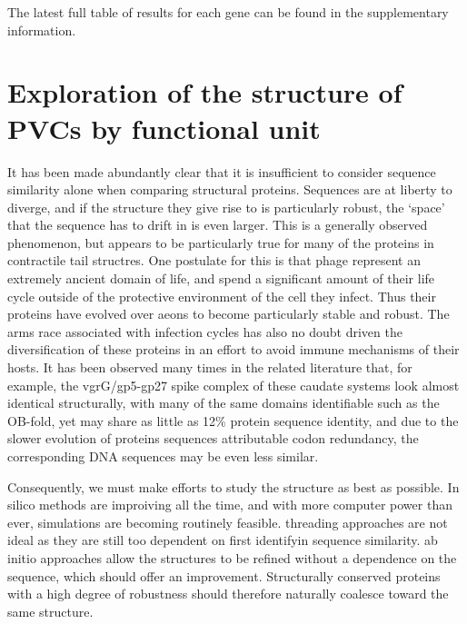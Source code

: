 	The latest full table of results for each gene can be found in the supplementary information.
	
	
	
\section{Exploration of the structure of PVCs by functional unit}
It has been made abundantly clear that it is insufficient to consider sequence similarity alone when comparing structural proteins. Sequences are at liberty to diverge, and if the structure they give rise to is particularly robust, the `space' that the sequence has to drift in is even larger. This is a generally observed phenomenon, but appears to be particularly true for many of the proteins in contractile tail structres. One postulate for this is that phage represent an extremely ancient domain of life, and spend a significant amount of their life cycle outside of the protective environment of the cell they infect. Thus their proteins have evolved over aeons to become particularly stable and robust. The arms race associated with infection cycles has also no doubt driven the diversification of these proteins in an effort to avoid immune mechanisms of their hosts. It has been observed many times in the related literature that, for example, the vgrG/gp5-gp27 spike complex of these caudate systems look almost identical structurally, with many of the same domains identifiable such as the OB-fold, yet may share as little as 12\% protein sequence identity, and due to the slower evolution of proteins sequences attributable codon redundancy, the corresponding DNA sequences may be even less similar.

Consequently, we must make efforts to study the structure as best as possible. In silico methods are improiving all the time, and with more computer power than ever, simulations are becoming routinely feasible. threading approaches are not ideal as they are still too dependent on first identifyin sequence similarity. ab initio approaches allow the structures to be refined without a dependence on the sequence, which should offer an improvement. Structurally conserved proteins with a high degree of robustness should therefore naturally coalesce toward the same structure.

